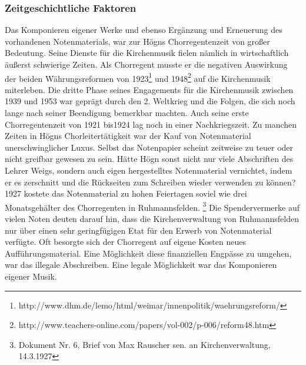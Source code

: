 \documentclass[a4paper]{article}
\begin{document}
\subsubsection{Zeitgeschichtliche Faktoren}
\hypertarget{RefHeadingToc100333746}{}Das Komponieren eigener Werke und
ebenso Ergänzung und Erneuerung des vorhandenen Notenmaterials, war zur
Högns Chorregentenzeit von großer Bedeutung. Seine Dienste für die
Kirchenmusik fielen nämlich in wirtschaftlich äußerst schwierige
Zeiten. Als Chorregent musste er die negativen Auswirkung der beiden
Währungsreformen von 1923\footnote{
http://www.dhm.de/lemo/html/weimar/innenpolitik/waehrungsreform/} und
1948\footnote{
http://www.teachers-online.com/papers/vol-002/p-006/reform48.htm} auf
die Kirchenmusik miterleben. Die dritte Phase seines Engagements für
die Kirchenmusik zwischen 1939 und 1953 war geprägt durch den 2.
Weltkrieg und die Folgen, die sich noch lange nach seiner Beendigung
bemerkbar machten. Auch seine erste Chorregentenzeit von 1921 bis1924
lag noch in einer Nachkriegszeit. Zu manchen Zeiten in Högns
Chorleitertätigkeit war der Kauf von Notenmaterial unerschwinglicher
Luxus. Selbst das Notenpapier scheint zeitweise zu teuer oder nicht
greifbar gewesen zu sein. Hätte Högn sonst nicht nur viele Abschriften
des Lehrer Weigs, sondern auch eigen hergestelltes Notenmaterial
vernichtet, indem er es zerschnitt und die Rückseiten zum Schreiben
wieder verwenden zu können? 1927 kostete das Notenmaterial zu hohen
Feiertagen soviel wie drei Monatsgehälter des Chorregenten in
Ruhmannsfelden. \footnote{Dokument Nr. 6, Brief von Max Rauscher sen.
an Kirchenverwaltung, 14.3.1927} Die Spendervermerke auf vielen Noten
deuten darauf hin, dass die Kirchenverwaltung von Ruhmannsfelden nur
über einen sehr geringfügigen Etat für den Erwerb von Notenmaterial
verfügte. Oft besorgte sich der Chorregent auf eigene Kosten neues
Aufführungsmaterial. Eine Möglichkeit diese finanziellen Engpässe zu
umgehen, war das illegale Abschreiben. Eine legale Möglichkeit war das
Komponieren eigener Musik.
\end{document}

